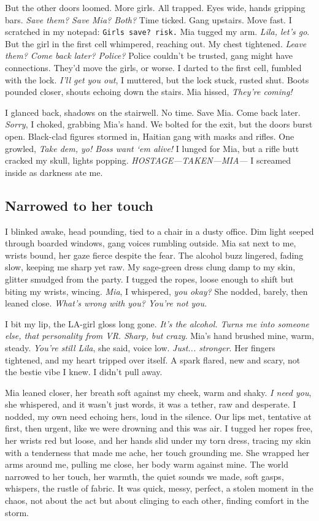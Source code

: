 \documentclass[12pt,oneside]{book}
\newcommand{\note}[1]{\texttt{#1}}
\begin{document}
But the other doors loomed. More girls. All trapped. Eyes wide, hands gripping bars. \textit{Save them? Save Mia? Both?} Time ticked. Gang upstairs. Move fast. I scratched in my notepad: \note{Girls save? risk.} Mia tugged my arm. \textit{Lila, let’s go}. But the girl in the first cell whimpered, reaching out. My chest tightened. \textit{Leave them? Come back later? Police?} Police couldn’t be trusted, gang might have connections. They’d move the girls, or worse. I darted to the first cell, fumbled with the lock. \textit{I’ll get you out}, I muttered, but the lock stuck, rusted shut. Boots pounded closer, shouts echoing down the stairs. Mia hissed, \textit{They’re coming!}

I glanced back, shadows on the stairwell. No time. Save Mia. Come back later. \textit{Sorry}, I choked, grabbing Mia’s hand. We bolted for the exit, but the doors burst open. Black-clad figures stormed in, Haitian gang with masks and rifles.  One growled, \textit{Take dem, yo! Boss want ‘em alive!} I lunged for Mia, but a rifle butt cracked my skull, lights popping. \textit{HOSTAGE—TAKEN—MIA—} I screamed inside as darkness ate me.

\subsection*{Narrowed to her touch}

I blinked awake, head pounding, tied to a chair in a dusty office. Dim light seeped through boarded windows, gang voices rumbling outside. Mia sat next to me, wrists bound, her gaze fierce despite the fear. The alcohol buzz lingered, fading slow, keeping me sharp yet raw. My sage-green dress clung damp to my skin, glitter smudged from the party. I tugged the ropes, loose enough to shift but biting my wrists, wincing. \textit{Mia}, I whispered, \textit{you okay?} She nodded, barely, then leaned close. \textit{What’s wrong with you? You’re not you.}

I bit my lip, the LA-girl gloss long gone. \textit{It’s the alcohol. Turns me into someone else, that personality from VR. Sharp, but crazy}. Mia’s hand brushed mine, warm, steady. \textit{You’re still Lila}, she said, voice low. \textit{Just... stronger}. Her fingers tightened, and my heart tripped over itself. A spark flared, new and scary, not the bestie vibe I knew. I didn’t pull away.

Mia leaned closer, her breath soft against my cheek, warm and shaky. \textit{I need you}, she whispered, and it wasn’t just words, it was a tether, raw and desperate. I nodded, my own need echoing hers, loud in the silence. Our lips met, tentative at first, then urgent, like we were drowning and this was air. I tugged her ropes free, her wrists red but loose, and her hands slid under my torn dress, tracing my skin with a tenderness that made me ache, her touch grounding me. She wrapped her arms around me, pulling me close, her body warm against mine. The world narrowed to her touch, her warmth, the quiet sounds we made, soft gasps, whispers, the rustle of fabric. It was quick, messy, perfect, a stolen moment in the chaos, not about the act but about clinging to each other, finding comfort in the storm.
\end{document}
